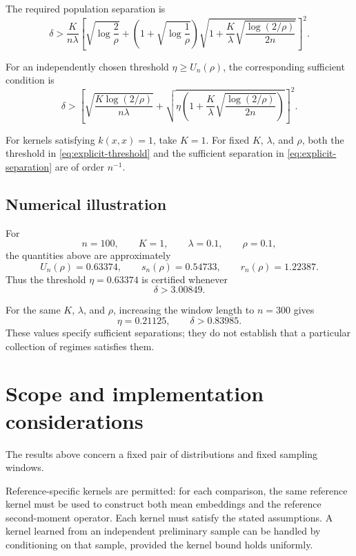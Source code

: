 \documentclass[11pt]{article}
\begin{document}
The required population separation is
\begin{equation}
    \boxed{
    \delta>
    \frac{K}{n\lambda}
    \left[
        \sqrt{\log\frac2\rho}
        +
        \left(1+\sqrt{\log\frac1\rho}\right)
        \sqrt{
            1+
            \frac K\lambda
            \sqrt{\frac{\log(2/\rho)}{2n}}
        }
    \right]^2.
    }
    \label{eq:explicit-separation}
\end{equation}

For an independently chosen threshold
$\eta\ge U_n(\rho)$, the corresponding sufficient
condition is
\begin{equation}
    \boxed{
    \delta>
    \left[
        \sqrt{\frac{K\log(2/\rho)}{n\lambda}}
        +
        \sqrt{
            \eta
            \left(
                1+\frac K\lambda
                \sqrt{\frac{\log(2/\rho)}{2n}}
            \right)
        }
    \right]^2.
    }
    \label{eq:chosen-threshold-separation}
\end{equation}

For kernels satisfying $k(x,x)=1$, take $K=1$.
For fixed $K$, $\lambda$, and $\rho$, both the threshold
in \eqref{eq:explicit-threshold} and the sufficient
separation in \eqref{eq:explicit-separation} are of
order $n^{-1}$.

\subsection{Numerical illustration}

For
\[
    n=100,\qquad K=1,\qquad
    \lambda=0.1,\qquad \rho=0.1,
\]
the quantities above are approximately
\[
    U_n(\rho)=0.63374,
    \qquad
    s_n(\rho)=0.54733,
    \qquad
    r_n(\rho)=1.22387.
\]
Thus the threshold $\eta=0.63374$ is certified whenever
\[
    \delta>3.00849.
\]

For the same $K$, $\lambda$, and $\rho$, increasing the
window length to $n=300$ gives
\[
    \eta=0.21125,
    \qquad
    \delta>0.83985.
\]
These values specify sufficient separations; they do not
establish that a particular collection of regimes
satisfies them.

\section{Scope and implementation considerations}

The results above concern a fixed pair of distributions
and fixed sampling windows.

Reference-specific kernels are permitted: for each
comparison, the same reference kernel must be used to
construct both mean embeddings and the reference
second-moment operator. Each kernel must satisfy the
stated assumptions. A kernel learned from an independent
preliminary sample can be handled by conditioning on
that sample, provided the kernel bound holds uniformly.
\end{document}
